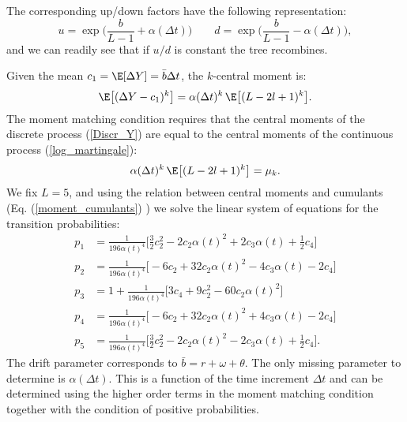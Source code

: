 The corresponding up/down factors have the following representation:
\begin{equation}\label{updown}
 u = \exp\biggl( \frac{b}{L-1} + \alpha(\Delta t) \biggr) \hspace{2em}  d = \exp\biggl( \frac{b}{L-1} - \alpha(\Delta t) \biggr),
\end{equation}
and we can readily see that if $u/d$ is constant the tree recombines.

Given the mean $c_1 = \E[\Delta Y] = \bar b \Delta t$, the $k$-central moment is:
\begin{equation}\label{higher_moments}
 \E \bigl[ (\Delta Y - c_1)^k \bigr] = \alpha(\Delta t)^k\, \E \bigl[ (L-2l+1)^{k} \bigr].
\end{equation}
The moment matching condition requires that the central moments of the discrete process (\ref{Discr_Y}) 
are equal to the central moments
of the continuous process (\ref{log_martingale}):
\begin{equation}\label{moment_matching}
 \alpha(\Delta t)^k\, \E \bigl[ (L-2l+1)^{k} \bigr] = \mu_k.
\end{equation}
We fix $L=5$, and using the relation between central moments and cumulants (Eq. (\ref{moment_cumulants}) )
we solve the linear system of equations for the transition probabilities:
\begin{align}\label{probabilities1}
 p_1 &= \frac{1}{196 \alpha(t)^4} \biggl[ \frac{3}{2} c_2^2 -2 c_2\alpha(t)^2 + 2 c_3 \alpha(t) +\frac{1}{2} c_4  \biggr] \\ \nonumber
 p_2 &= \frac{1}{196 \alpha(t)^4} \biggl[ -6 c_2 + 32c_2 \alpha(t)^2 - 4c_3 \alpha(t) -2 c_4 \biggr] \\ \nonumber
 p_3 &=  1 + \frac{1}{196 \alpha(t)^4} \biggl[ 3c_4 + 9c_2^2 -60c_2 \alpha(t)^2   \biggr] \\ \nonumber
 p_4 &= \frac{1}{196 \alpha(t)^4} \biggl[ -6 c_2 + 32c_2 \alpha(t)^2 + 4c_3 \alpha(t) -2 c_4  \biggr] \\ \nonumber
 p_5 &= \frac{1}{196 \alpha(t)^4} \biggl[ \frac{3}{2} c_2^2 -2 c_2\alpha(t)^2 - 2 c_3 \alpha(t) +\frac{1}{2} c_4 \biggr].
\end{align}
The drift parameter corresponds to $\bar b = r+\omega + \theta$.
The only missing parameter to determine is $\alpha(\Delta t)$. This is a function of the time increment $\Delta t$ and can be determined using the 
higher order terms in the moment matching condition together with the condition of positive probabilities.

